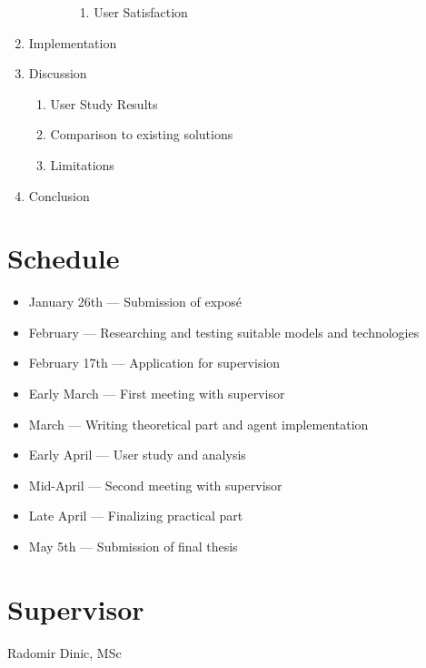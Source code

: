 \documentclass[12pt,a4paper]{article}
\begin{document}
\begin{enumerate}
\begin{enumerate}
\begin{enumerate}
\begin{enumerate}
				                  \item User Satisfaction
			                  \end{enumerate}
		            \end{enumerate}
	      \end{enumerate}
	\item Implementation
	\item Discussion
	      \begin{enumerate}
		      \item User Study Results
		      \item Comparison to existing solutions
		      \item Limitations
	      \end{enumerate}
	\item Conclusion
\end{enumerate}

\nocite{*}
\printbibliography

\section*{Schedule}

\begin{itemize}
	\item January 26th — Submission of exposé
	\item February — Researching and testing suitable models and technologies
	\item February 17th — Application for supervision
	\item Early March — First meeting with supervisor
	\item March — Writing theoretical part and agent implementation
	\item Early April — User study and analysis
	\item Mid-April — Second meeting with supervisor
	\item Late April — Finalizing practical part
	\item May 5th — Submission of final thesis
\end{itemize}

\section*{Supervisor}
Radomir Dinic, MSc
\end{document}
